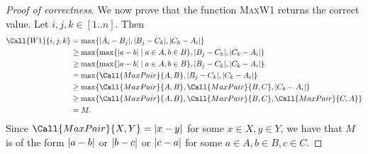 \documentclass[12pt]{article}
\begin{document}
\begin{solution}
\begin{enumerate}[wide]
\begin{proof}[Proof of correctness]
                We now prove that the function \textsc{MaxW1} returns the correct value.
                Let $i, j, k \in [1..n]$.
                Then
                \begin{align*}
                    \Call{W1}{i, j, k} &= \max\set{\abs{A_{i} - B_{j}}, \abs{B_{j} - C_{k}}, \abs{C_{k} - A_{i}}} \\
                                       &\geq \max\set{\max\set{\abs{a - b} \mid a \in A, b \in B}, \abs{B_{j} - C_{k}}, \abs{C_{k} - A_{i}}} \\
                                       &\geq \max\set{\max\set{\abs{a - b} \mid a \in A, b \in B}, \abs{B_{j} - C_{k}}, \abs{C_{k} - A_{i}}} \\
                                       &= \max\set{\Call{MaxPair}{A, B}, \abs{B_{j} - C_{k}}, \abs{C_{k} - A_{i}}} \\
                                       &\geq \max\set{\Call{MaxPair}{A, B}, \Call{MaxPair}{B, C}, \abs{C_{k} - A_{i}}} \\
                                       &\geq \max\set{\Call{MaxPair}{A, B}, \Call{MaxPair}{B, C}, \Call{MaxPair}{C, A}} \\
                                       &= M.
                \end{align*}
                Since $\Call{MaxPair}{X, Y} = \abs{x - y}$ for some $x \in X, y \in Y$,
                we have that $M$ is of the form $\abs{a - b}$ or $\abs{b - c}$ or $\abs{c - a}$
                for some $a \in A, b \in B, c \in C$.


\end{proof}
\end{enumerate}
\end{solution}
\end{document}
